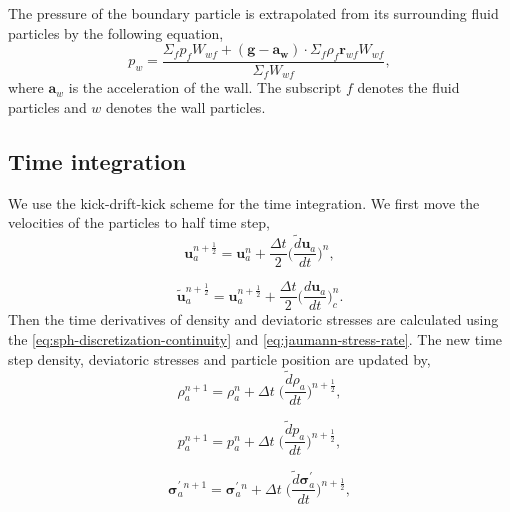 \documentclass[preprint,12pt]{elsarticle}
\newcommand{\teng}[1]{\ensuremath{\boldsymbol{#1}}}
\newcommand{\ten}[1]{\ensuremath{\mathbf{#1}}}
\begin{document}
The pressure of the boundary particle is extrapolated from its surrounding
fluid particles by the following equation,
\begin{equation}
  \label{eq:pressure-bc}
  p_w = \frac{\Sigma_f p_f W_{wf} + (\ten{g} - \ten{a}_{\ten{w}}) \cdot \Sigma_f
    \rho_f \ten{r}_{wf} W_{wf}}{\Sigma_f W_{wf}},
\end{equation}
where $\ten{a}_w$ is the acceleration of the wall. The subscript $f$ denotes
the fluid particles and $w$ denotes the wall particles.

\subsection{Time integration}

We use the kick-drift-kick scheme for the time integration. We first move the
velocities of the particles to half time step,
\begin{equation}
  \label{eq:velocity-update-stage-1}
  \ten{u}_a^{n+\frac{1}{2}} = \ten{u}_a^{n} + \frac{\Delta t}{2} \bigg(\frac{\tilde{d}\ten{u}_{a}}{dt}\bigg)^n,
\end{equation}

\begin{equation}
  \label{eq:velocity-hat-update-stage-1}
  \ten{\tilde{u}}_a^{n+\frac{1}{2}} = \ten{u}_a^{n+\frac{1}{2}} + \frac{\Delta t}{2} \bigg(\frac{d\ten{u}_{a}}{dt}\bigg)^{n}_{c}.
\end{equation}
%
Then the time derivatives of density and deviatoric stresses are calculated
using the \cref{eq:sph-discretization-continuity} and
\cref{eq:jaumann-stress-rate}. The new time step density, deviatoric stresses
and particle position are updated by,
\begin{equation}
  \label{eq:density-update-stage-2}
  \rho_{a}^{n+1} = \rho_{a}^{n} + \Delta t \; \bigg(\frac{\tilde{d}\rho_{a}}{dt}\bigg)^{n+\frac{1}{2}},
\end{equation}

\begin{equation}
  \label{eq:pressure-update-stage-2}
  p_{a}^{n+1} = p_{a}^{n} + \Delta t \; \bigg(\frac{\tilde{d}p_{a}}{dt}\bigg)^{n+\frac{1}{2}},
\end{equation}

\begin{equation}
  \label{eq:stress-update-stage-2}
  \teng{\sigma}_{a}^{' \; n+1} = \teng{\sigma}_{a}^{' \; n} +
  \Delta t \; \bigg(\frac{\tilde{d}\teng{\sigma}^{'}_{a}}{dt}\bigg)^{n+\frac{1}{2}},
\end{equation}
\end{document}

